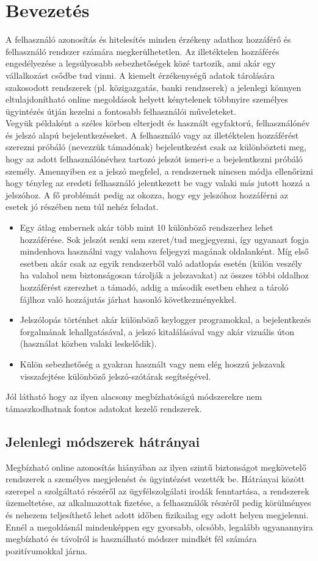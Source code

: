 \section{Bevezetés}
A felhasználó azonosítás és hitelesítés minden érzékeny adathoz hozzáférő és felhasználó rendszer számára megkerülhetetlen. Az illetéktelen hozzáférés engedélyezése a legsúlyosabb sebezhetőségek közé tartozik, ami akár egy vállalkozást csődbe tud vinni.
A kiemelt érzékenységű adatok tárolására szakosodott rendszerek (pl. közigazgatás, banki rendzserek) a jelenlegi könnyen eltulajdonítható online megoldások helyett kénytelenek többnyire személyes ügyintézés útján kezelni a fontosabb felhasználói műveleteket.
\\
Vegyük példaként a széles körben elterjedt és használt egyfaktorú,  felhasználónév és jelszó alapú bejelentkezéseket. A felhasználó vagy az illetéktelen hozzáférést szerezni próbáló (nevezzük támadónak) bejelentkezést csak az különbözteti meg, hogy az adott felhasználónévhez tartozó jelszót ismeri-e a bejelentkezni próbáló személy. Amennyiben ez a jelszó megfelel, a rendszernek 
nincsen módja ellenőrizni hogy tényleg az eredeti felhasználó jelentkezett be vagy valaki más jutott hozzá a jelszóhoz. A fő problémát pedig az okozza, hogy egy jelszóhoz hozzáférni az esetek jó részében nem túl nehéz feladat.
\begin{itemize}
\item Egy átlag embernek akár több mint 10 különböző rendszerhez lehet hozzáférése. Sok jelszót senki sem szeret/tud megjegyezni, így ugyanazt fogja mindenhova használni vagy valahova feljegyzi magának oldalanként. Míg első esetben akár csak az egyik rendszerből való adatlopás esetén (külön veszély ha valahol nem biztonságosan tárolják a jelszavakat) az összes többi oldalhoz hozzáférést
 szerezhet a támadó, addig a második esetben ehhez a tároló fájlhoz való hozzájutás járhat hasonló következményekkel.
\item Jelszólopás történhet akár különböző keylogger programokkal, a bejelentkezés forgalmának lehallgatásával, a jelszó kitalálásával vagy akár vizuális úton (használat közben valaki leskelődik).
\item Külön sebezhetőség a gyakran használt vagy nem elég hoszzú jelszavak visszafejtése különböző jelszó-szótárak segítségével.
\end{itemize}
Jól látható hogy az ilyen alacsony megbízhatóságú módszerekre nem támaszkodhatnak fontos adatokat kezelő rendszerek.
\subsection{Jelenlegi módszerek hátrányai}
Megbízható online azonosítás hiányában az ilyen szintű biztonságot megkövetelő rendszerek a személyes megjelenést és ügyintézést vezették be. Hátrányai között szerepel a szolgáltató részéről az ügyfélszolgálati irodák fenntartása, a rendszerek üzemeltetése, az alkalmazottak fizetése, a felhasználók részéről pedig körülményes és nehezem teljesíthető lehet adott időben fizikailag egy adott helyen megjelenni. Ennél a megoldásnál mindenképpen egy gyorsabb, olcsóbb, legalább ugyanannyira megbízható és távolról is használható módszer mindkét fél számára pozitívumokkal járna.
